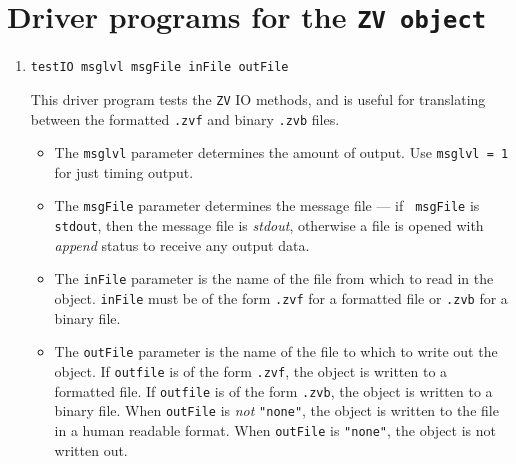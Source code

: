 \par
\section{Driver programs for the {\tt ZV object}}
\label{section:ZV:drivers}
\par
\begin{enumerate}
\item
\begin{verbatim}
testIO msglvl msgFile inFile outFile
\end{verbatim}
This driver program tests the {\tt ZV} IO methods,
and is useful for translating between the formatted {\tt *.zvf}
and binary {\tt *.zvb} files.
\par
\begin{itemize}
\item
The {\tt msglvl} parameter determines the amount of output.
Use {\tt msglvl = 1} for just timing output.
\item
The {\tt msgFile} parameter determines the message file --- if {\tt
msgFile} is {\tt stdout}, then the message file is {\it stdout},
otherwise a file is opened with {\it append} status to receive any
output data.
\item
The {\tt inFile} parameter is the name of the file 
from which to read in the object.
{\tt inFile} must be of the form {\tt *.zvf} for a formatted file
or {\tt *.zvb} for a binary file.
\item
The {\tt outFile} parameter is the name of the file 
to which to write out the object.
If {\tt outfile} is of the form {\tt *.zvf}, the object is written
to a formatted file.
If {\tt outfile} is of the form {\tt *.zvb}, the object is written
to a binary file.
When {\tt outFile} is {\it not} {\tt "none"}, 
the object is written to the file in a human readable format.
When {\tt outFile} is {\tt "none"}, the object is not written out.
\end{itemize}
\end{enumerate}
